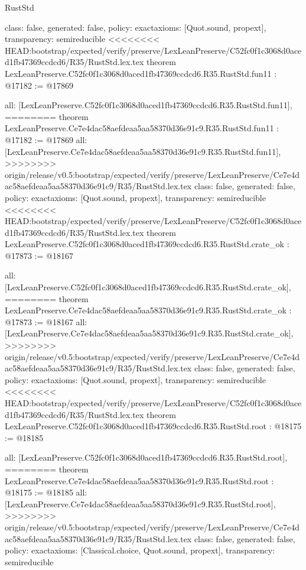 \begin{lexlean}{RustStd}
\begin{coremodule}
{\begin{coremodule}
{{{{{{{{{{{{{{  class: false,
  generated: false,
  policy: exact{axioms: [Quot.sound, propext]},
  transparency: semireducible
}
<<<<<<<< HEAD:bootstrap/expected/verify/preserve/LexLeanPreserve/C52fc0f1c3068d0aced1fb47369ccdcd6/R35/RustStd.lex.tex
theorem LexLeanPreserve.C52fc0f1c3068d0aced1fb47369ccdcd6.R35.RustStd.fun11 : @17182 := @17869 {
  all: [LexLeanPreserve.C52fc0f1c3068d0aced1fb47369ccdcd6.R35.RustStd.fun11],
========
theorem LexLeanPreserve.Ce7e4dac58aefdeaa5aa58370d36e91c9.R35.RustStd.fun11 : @17182 := @17869 {
  all: [LexLeanPreserve.Ce7e4dac58aefdeaa5aa58370d36e91c9.R35.RustStd.fun11],
>>>>>>>> origin/release/v0.5:bootstrap/expected/verify/preserve/LexLeanPreserve/Ce7e4dac58aefdeaa5aa58370d36e91c9/R35/RustStd.lex.tex
  class: false,
  generated: false,
  policy: exact{axioms: [Quot.sound, propext]},
  transparency: semireducible
}
<<<<<<<< HEAD:bootstrap/expected/verify/preserve/LexLeanPreserve/C52fc0f1c3068d0aced1fb47369ccdcd6/R35/RustStd.lex.tex
theorem LexLeanPreserve.C52fc0f1c3068d0aced1fb47369ccdcd6.R35.RustStd.crate_ok : @17873 := @18167 {
  all: [LexLeanPreserve.C52fc0f1c3068d0aced1fb47369ccdcd6.R35.RustStd.crate_ok],
========
theorem LexLeanPreserve.Ce7e4dac58aefdeaa5aa58370d36e91c9.R35.RustStd.crate_ok : @17873 := @18167 {
  all: [LexLeanPreserve.Ce7e4dac58aefdeaa5aa58370d36e91c9.R35.RustStd.crate_ok],
>>>>>>>> origin/release/v0.5:bootstrap/expected/verify/preserve/LexLeanPreserve/Ce7e4dac58aefdeaa5aa58370d36e91c9/R35/RustStd.lex.tex
  class: false,
  generated: false,
  policy: exact{axioms: [Quot.sound, propext]},
  transparency: semireducible
}
<<<<<<<< HEAD:bootstrap/expected/verify/preserve/LexLeanPreserve/C52fc0f1c3068d0aced1fb47369ccdcd6/R35/RustStd.lex.tex
theorem LexLeanPreserve.C52fc0f1c3068d0aced1fb47369ccdcd6.R35.RustStd.root : @18175 := @18185 {
  all: [LexLeanPreserve.C52fc0f1c3068d0aced1fb47369ccdcd6.R35.RustStd.root],
========
theorem LexLeanPreserve.Ce7e4dac58aefdeaa5aa58370d36e91c9.R35.RustStd.root : @18175 := @18185 {
  all: [LexLeanPreserve.Ce7e4dac58aefdeaa5aa58370d36e91c9.R35.RustStd.root],
>>>>>>>> origin/release/v0.5:bootstrap/expected/verify/preserve/LexLeanPreserve/Ce7e4dac58aefdeaa5aa58370d36e91c9/R35/RustStd.lex.tex
  class: false,
  generated: false,
  policy: exact{axioms: [Classical.choice, Quot.sound, propext]},
  transparency: semireducible
}

}}}}}}}}}}}}}}}}
\end{coremodule}}
\end{coremodule}
\end{lexlean}
